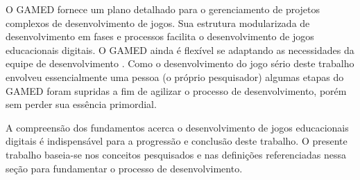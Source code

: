 \vspace{-0.2cm}

O GAMED fornece um plano detalhado para o gerenciamento de projetos complexos de desenvolvimento de jogos. Sua estrutura modularizada de desenvolvimento em fases e processos facilita o desenvolvimento de jogos educacionais digitais. O GAMED ainda é flexível se adaptando as necessidades da equipe de desenvolvimento 
\cite{aslan2016digital}. Como o desenvolvimento do jogo sério deste trabalho envolveu essencialmente uma pessoa (o próprio pesquisador) algumas etapas do GAMED foram supridas a fim de agilizar o processo de desenvolvimento, porém sem perder sua essência primordial. 

\vspace{-0.2cm}

A compreensão dos fundamentos acerca o desenvolvimento de jogos educacionais digitais é indispensável para a progressão e conclusão deste trabalho. O presente trabalho baseia-se nos conceitos pesquisados e nas definições referenciadas nessa seção para fundamentar o processo de desenvolvimento.





